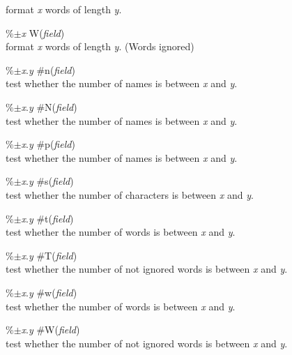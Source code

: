 \documentclass[a4paper]{article}
\newenvironment{FlatList}{\begin{list}{}{%
      \topsep=0pt\itemsep=0pt\parsep=0pt\let\makelabel=\flatlistlabel}}{\end{list}}%
\newcommand\flatlistlabel[1]{\descriptionlabel{\textsf{#1}}}
\begin{document}
\begin{multicols}{4}
\begin{FlatList}
    format {\it x}\/ words of length {\it y}.
  \item [\%$\pm ${\it x}\/ W({\it field}\/)]\ \\
    format {\it x}\/ words of length {\it y}. (Words ignored)
  \item [\%$\pm ${\it x}.{\it y}\/ \#n({\it field}\/)]\ \\
    test whether the  number of names is between {\it x}\/ and {\it y}.
  \item [\%$\pm ${\it x}.{\it y}\/ \#N({\it field}\/)]\ \\
    test whether the  number of names is between {\it x}\/ and {\it y}.
  \item [\%$\pm ${\it x}.{\it y}\/ \#p({\it field}\/)]\ \\
    test whether the  number of names is between {\it x}\/ and {\it y}.
  \item [\%$\pm ${\it x}.{\it y}\/ \#s({\it field}\/)]\ \\
    test whether the  number of characters is between {\it x}\/ and {\it y}.
  \item [\%$\pm ${\it x}.{\it y}\/ \#t({\it field}\/)]\ \\
    test whether the  number of words is between {\it x}\/ and {\it y}.
  \item [\%$\pm ${\it x}.{\it y}\/ \#T({\it field}\/)]\ \\
    test whether the  number of not ignored words is between {\it x}\/
    and {\it y}. 
  \item [\%$\pm ${\it x}.{\it y}\/ \#w({\it field}\/)]\ \\
    test whether the  number of words is between {\it x}\/ and {\it y}.
  \item [\%$\pm ${\it x}.{\it y}\/ \#W({\it field}\/)]\ \\
    test whether the  number of not ignored words is between {\it x}\/
    and {\it y}. 
  \end{FlatList} 


\end{multicols}
\end{document}
